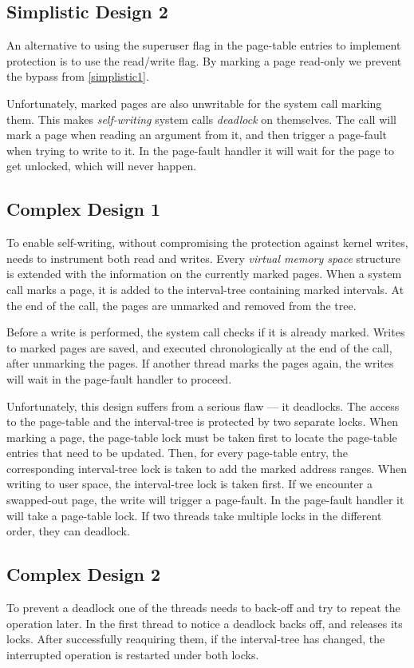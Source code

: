 \subsection{Simplistic Design 2}
\label{simplistic2}
An alternative to using the superuser flag in the page-table entries to implement
protection is to use the read/write flag. By marking a page read-only we prevent
the bypass from \autoref{simplistic1}.

Unfortunately, marked pages are also unwritable for the system call marking them.
This makes \emph{self-writing} system calls \emph{deadlock} on themselves. The call
will mark a page when reading an argument from it, and then trigger a page-fault
when trying to write to it. In the page-fault handler it will wait for the page to 
get unlocked, which will never happen.

\subsection{Complex Design 1}
\label{complex1}
To enable self-writing, without compromising the protection against kernel
writes, \sysname needs to instrument both read and writes. Every \emph{virtual
memory space} structure is extended with the information on the currently marked
pages. When a system call marks a page, it is added to the interval-tree
containing marked intervals. At the end of the call, the pages are unmarked and
removed from the tree.

Before a write is performed, the system call checks if it is already marked.
Writes to marked pages are saved, and executed chronologically at the end of
the call, after unmarking the pages. If another thread marks the pages again,
the writes will wait in the page-fault handler to proceed.

Unfortunately, this design suffers from a serious flaw --- it deadlocks. The
access to the page-table and the interval-tree is protected by two separate
locks. When marking a page, the page-table lock must be taken first to locate
the page-table entries that need to be updated. Then, for every page-table
entry, the corresponding interval-tree lock is taken to add the marked address
ranges. When writing to user space, the interval-tree lock is taken first. If we
encounter a swapped-out page, the write will trigger a page-fault. In the
page-fault handler it will take a page-table lock. If two threads take multiple
locks in the different order, they can deadlock.

\subsection{Complex Design 2}
\label{complex2}
To prevent a deadlock one of the threads needs to back-off and try to repeat the
operation later. In \sysname the first thread to notice a deadlock backs off, and
releases its locks. After successfully reaquiring them, if the interval-tree has 
changed, the interrupted operation is restarted under both locks.

